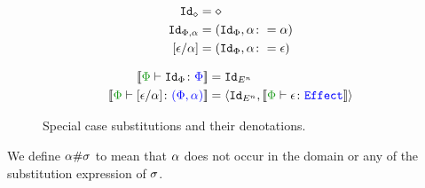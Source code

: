 \documentclass{Report}
\begin{document}
\begin{figure}[H]
    \centering
    \begin{minipage}{.45\linewidth}
        \begin{framed}
            \begin{align*}
                \Id{\nil} & = \nil\\
                \Id{\P,\a} & = (\Id{\P}, \a\setto\a)\\
                \ssub{\a}{\e} & = (\Id{\P}, \a\setto \e)
            \end{align*}
        \end{framed}
    \end{minipage}
    \quad
    \begin{minipage}{.45\linewidth}
        \begin{framed}
            \begin{align*}
                \deno{\typerelation{\P}{\Id{\P}}{\P}} & = \Id{E^n}\\
                \deno{\typerelation{\P}{\ssub{\a}{\e}}{(\P,\a)}} & = \pr{\Id{E^n}}{\deno{\typerelation{\P}{\e}{\effect}}}
                \\
            \end{align*}
        \end{framed}
    \end{minipage}
    \caption{Special case substitutions and their denotations.}
    \label{EffectSpecialSubs}
\end{figure}

\begin{framed}
    \begin{definition}[Freshness]\label{EffectFreshness}
      We define $\alpha \# \sigma$ to mean that $\alpha$ does not occur in the domain or any of the substitution expression of $\sigma$.
    \end{definition}
\end{framed}
\end{document}
